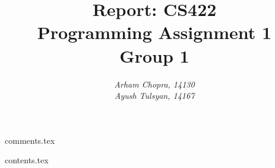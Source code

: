 \documentclass[5pt]{report}
\title{\LARGE{Report: CS422} \\ \vspace{25pt} \LARGE{Programming Assignment 1} \\ \vspace{25pt} \Large{Group 1}}
\author{\textit{Arham Chopra, 14130} \\ \textit{Ayush Tulsyan, 14167}}
\date{}
\begin{document}
\maketitle

 {comments.tex}

\newpage

 {contents.tex}
\end{document}

